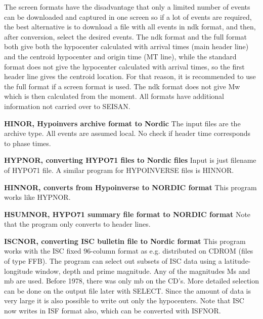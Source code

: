 The screen formats have the disadvantage that only a limited number of events can be downloaded and captured in one screen so if a lot of events are required, the best alternative is to download a file with all events in ndk format, and then, after conversion, select the desired events.
\newline
The ndk format and the full format both give both the hypocenter calculated with arrival times (main header line) and the centroid hypocenter and origin time (MT line), while the standard format does not give the  hypocenter calculated with arrival times, so the first header line gives the centroid location. For that reason, it is recommended to use the full format if a screen format is used.
\newline 
The ndk format does not give Mw which is then calculated from the moment. 
All formats have additional information not carried over to SEISAN.


\textbf{HINOR, Hypoinvers archive format to Nordic}\newline
The input files are the archive type. All events are assumed local.
No check if header time corresponds to phase times. 

\textbf{HYPNOR, converting HYPO71 files to Nordic files}
\newline
{}
Input is just filename of HYPO71 file. A similar program for HYPOINVERSE files is HINNOR. 

\textbf{HINNOR, converts from Hypoinverse to NORDIC format} \newline
{} This program works like HYPNOR. 

\textbf{HSUMNOR, HYPO71 summary file format to NORDIC format } \newline
Note that the program only converts to header lines. 

\textbf{ISCNOR, converting ISC bulletin file to Nordic format } \newline
This program works with the ISC fixed 96-column format as e.g. distributed on CDROM (files of type FFB). The program can select out subsets of ISC data using a latitude-longitude window, depth and prime magnitude. Any of the magnitudes Ms and mb are used. Before 1978, there was only mb on the CD's. More detailed selection can be done on the output file later with SELECT. Since the amount of data is very large it is also possible to write out only the hypocenters. Note that ISC now writes in ISF format also, which can be converted with ISFNOR. 

